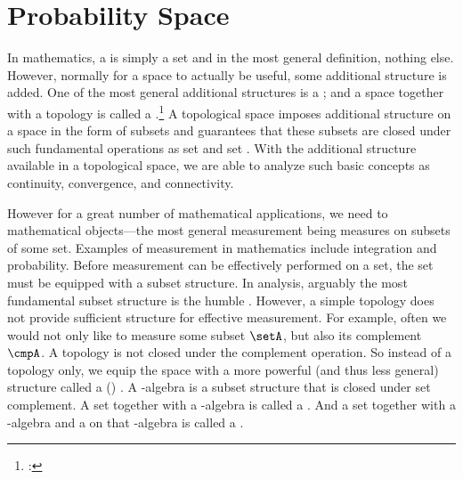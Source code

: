 
\section{Probability Space}
In mathematics, a  is simply a set and in the most general definition,
nothing else.
However, normally for a space to actually be useful, some additional structure is added.
One of the most general additional structures is a ;
and a space together with a topology is called a
.\footnote{: }
A topological space imposes additional structure on a space  in the form of subsets
and guarantees that these subsets are closed under such fundamental operations as
set  and set .
With the additional structure available in a topological space, we are able to
analyze such basic concepts as
continuity,
convergence, and
connectivity.

However for a great number of mathematical applications,
we need to  mathematical objects---the most general measurement being measures on subsets of some set.
Examples of measurement in mathematics include integration and probability.
Before measurement can be effectively performed on a set,
the set must be equipped with a subset structure.
In analysis, arguably the most fundamental subset structure is the humble  .
However, a simple topology does not provide sufficient structure
for effective measurement.
For example,
often we would not only like to measure some subset $\setA$,
but also its complement $\cmpA$.
A topology is not closed under the complement operation.
So instead of a topology only, we equip the space with a more powerful (and thus less general) structure
called a  () .
A \txsigma-algebra is a subset structure that is closed under set complement.
A set together with a \txsigma-algebra is called a .
And a set together with a \txsigma-algebra and a  on that \txsigma-algebra
is called a  .

